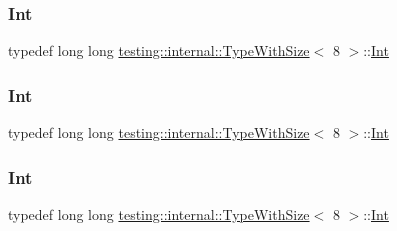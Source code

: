 \subsubsection{\texorpdfstring{Int}{Int}\hspace{0.1cm}{\footnotesize\ttfamily [1/3]}}
{\footnotesize\ttfamily typedef long long \mbox{\hyperlink{classtesting_1_1internal_1_1_type_with_size}{testing\+::internal\+::\+Type\+With\+Size}}$<$ 8 $>$\+::\mbox{\hyperlink{classtesting_1_1internal_1_1_type_with_size_3_018_01_4_a36d5697e5f5254b0495f13c97d747e36}{Int}}}

\mbox{\label{classtesting_1_1internal_1_1_type_with_size_3_018_01_4_a36d5697e5f5254b0495f13c97d747e36}} 
\subsubsection{\texorpdfstring{Int}{Int}\hspace{0.1cm}{\footnotesize\ttfamily [2/3]}}
{\footnotesize\ttfamily typedef long long \mbox{\hyperlink{classtesting_1_1internal_1_1_type_with_size}{testing\+::internal\+::\+Type\+With\+Size}}$<$ 8 $>$\+::\mbox{\hyperlink{classtesting_1_1internal_1_1_type_with_size_3_018_01_4_a36d5697e5f5254b0495f13c97d747e36}{Int}}}

\mbox{\label{classtesting_1_1internal_1_1_type_with_size_3_018_01_4_a36d5697e5f5254b0495f13c97d747e36}} 
\subsubsection{\texorpdfstring{Int}{Int}\hspace{0.1cm}{\footnotesize\ttfamily [3/3]}}
{\footnotesize\ttfamily typedef long long \mbox{\hyperlink{classtesting_1_1internal_1_1_type_with_size}{testing\+::internal\+::\+Type\+With\+Size}}$<$ 8 $>$\+::\mbox{\hyperlink{classtesting_1_1internal_1_1_type_with_size_3_018_01_4_a36d5697e5f5254b0495f13c97d747e36}{Int}}}

